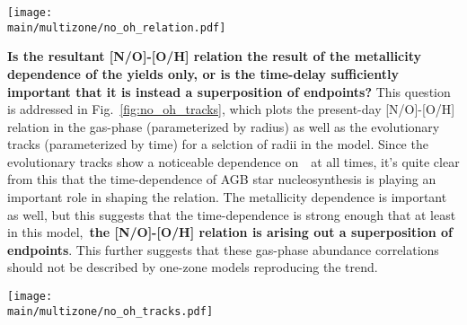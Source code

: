 \documentclass[\main/notes.tex]{subfiles}
\begin{document}
\begin{figure*} 
\centering 
\texttt{[image: \\main/multizone/no\_oh\_relation.pdf]} 
\caption{
Observational results on the gas-phase [N/O]-[O/H] relation in comparison with 
a fiducial model at the present day (solid, thick black line). 
For the fiducial model, each individual ring at a radius of~$\rgal~\geq$ 2 kpc 
is plotted as a point on the line. 
The fit to an analytic chemical evolution model using data from Galactic HII 
regions, main sequence and halo stars, and damped lyman alpha systems 
from~\citet{Henry2000} is shown in a dotted black line. 
Abundances derived from electron temperatures of HII in nearby NGC spiral 
galaxies at shown in grey X's~\citep*{Pilyugin2010}. 
Measurements from blue, star forming diffuse dwarf galaxies probing the low 
metallicity regime are shown in red triangles~\citep{Berg2012}, green 
stars~\citep*{Izotov2012}, and blue diamonds~\citep{James2015}. 
Emission line measurements from high-redshift HII regions are shown in purple 
circles~\citep{Dopita2016}. 
A sample of star-forming galaxies from MaNGA are shown in black 
squares~\citep{Belfiore2017}. 
The~\citet*{Pilyugin2010},~\citet{Berg2012},~\citet*{Izotov2012}, 
and~\citet{James2015} measurements are for individual systems, while 
the~\citet{Dopita2016} and~\citet{Belfiore2017} data represent a 
population-averaged trend. 
Error bars are omitted for visual clarity. 
} 
\label{fig:no_oh_observed} 
\end{figure*} 

\textbf{Is the resultant [N/O]-[O/H] relation the result of the metallicity 
dependence of the yields only, or is the time-delay sufficiently important 
that it is instead a superposition of endpoints?} 
This question is addressed in Fig.~\ref{fig:no_oh_tracks}, which plots the 
present-day [N/O]-[O/H] relation in the gas-phase (parameterized by radius) 
as well as the evolutionary tracks (parameterized by time) for a selction of 
radii in the model. 
Since the evolutionary tracks show a noticeable dependence on~\rgal~at all 
times, it's quite clear from this that the time-dependence of AGB star 
nucleosynthesis is playing an important role in shaping the relation. 
The metallicity dependence is important as well, but this suggests that the 
time-dependence is strong enough that at least in this model,~\textbf{the 
[N/O]-[O/H] relation is arising out a superposition of endpoints}. 
This further suggests that these gas-phase abundance correlations should not be 
described by one-zone models reproducing the trend. 

\begin{figure*} 
\centering 
\texttt{[image: \\main/multizone/no\_oh\_tracks.pdf]} 
\caption{
The present-day gas-phase [N/O] relation as a function of [O/H] in the fiducial 
model for~$\rgal~\geq$ 2 kpc (solid), shown alongside the gas-phase 
evolutionary tracks (i.e. parameterized by time) for~\rgal~= 2, 3, 4, ... , 13, 
14, and 15 kpc rings. 
} 
\label{fig:no_oh_tracks} 
\end{figure*} 

\biblio 
\end{document}
